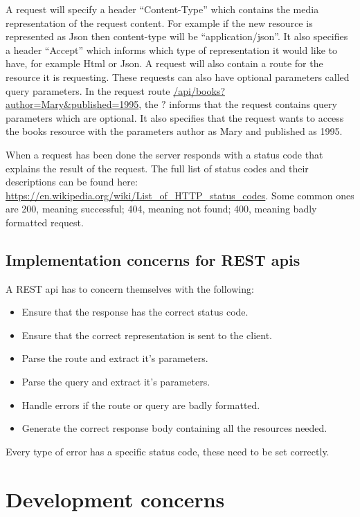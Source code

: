 A request will specify a header ``Content-Type'' which contains the media
representation of the request content. For example if the new resource is
represented as Json then content-type will be ``application/json''. It also
specifies a header ``Accept'' which informs which type of representation it
would like to have, for example Html or Json.  A request will also contain a
route for the resource it is requesting. These requests can also have optional
parameters called query parameters. In the request route
\url{/api/books?author=Mary&published=1995}, the $?$ informs that the request
contains query parameters which are optional.  It also specifies that the
request wants to access the books resource with the parameters author as Mary
and published as 1995.

When a request has been done the server responds with a status code that
explains the result of the request. The full list of status codes and their
descriptions can be found here:
\url{https://en.wikipedia.org/wiki/List_of_HTTP_status_codes}. Some common ones
are 200, meaning successful; 404, meaning not found; 400, meaning badly
formatted request.

\subsection{Implementation concerns for REST apis}

A REST api has to concern themselves with the following:

\begin{itemize}
\item Ensure that the response has the correct status code.
\item Ensure that the correct representation is sent to the client.
\item Parse the route and extract it's parameters. 
\item Parse the query and extract it's parameters.
\item Handle errors if the route or query are badly formatted.
\item Generate the correct response body containing all the resources needed.
\end{itemize}

Every type of error has a specific status code, these need to be set correctly.

\section{Development concerns} 

